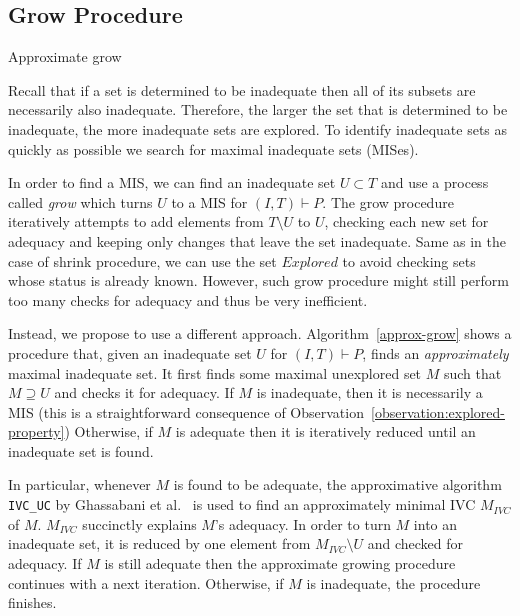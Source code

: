 \subsection{Grow Procedure}\label{sec:grow}
\begin{algorithm}[!t]
\begin{small}

\caption{Approximate grow}
\label{approx-grow}
\end{small}
\end{algorithm}

Recall that if a set is determined to be inadequate then all of its subsets are necessarily also inadequate. Therefore, the larger the set that is determined to be inadequate, the more inadequate sets are explored.  %
To identify inadequate sets as quickly as possible we search for maximal inadequate sets (MISes).

In order to find a MIS, we can find an inadequate set $U \subset T$ and use a process called \emph{grow} which turns $U$ to a MIS for $(I,T) \vdash P$.
The grow procedure iteratively attempts to add elements from $T \setminus U$ to $U$, checking each new set for adequacy and keeping only changes that leave the set inadequate. Same as in the case of shrink procedure, we can use the set $Explored$ to avoid checking sets whose status is already known.
However, such grow procedure might still perform too many checks for adequacy and thus be very inefficient.


Instead, we propose to use a different approach. Algorithm~\ref{approx-grow} shows a procedure that, given an inadequate set $U$ for $(I, T) \vdash P$, finds an \emph{approximately} maximal inadequate set.
It first finds some maximal unexplored set $M$ such that $M \supseteq U$ and checks it for adequacy.
If $M$ is inadequate, then it is necessarily a MIS
(this is a straightforward consequence of Observation~\ref{observation:explored-property}) %
Otherwise, if $M$ is adequate then it is iteratively reduced until an inadequate set is found.

In particular, whenever $M$ is found to be adequate, the approximative algorithm \texttt{IVC\_UC} by Ghassabani et al.~\cite{Ghass16} is used to find an approximately minimal IVC $M_{IVC}$ of $M$.  $M_{IVC}$ succinctly explains $M$'s adequacy. In order to turn $M$ into an inadequate set, it is reduced by one element from $M_{IVC} \setminus U$ and checked for adequacy. If $M$ is still adequate then the approximate growing procedure continues with a next iteration. Otherwise, if $M$ is inadequate, the procedure finishes.

